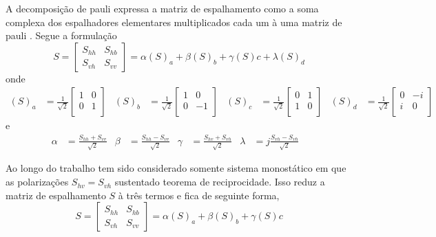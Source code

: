\documentclass[a4paper,12pt]{article}
\begin{document}
A decomposição de pauli expressa a matriz de espalhamento como a soma complexa dos espalhadores elementares multiplicados cada um à uma matriz de pauli \cite{jong:2009}. Segue a formulação
\begin{equation}
    S = \begin{bmatrix}
        S_{hh} & S_{hb}\\
	    S_{vh} & S_{vv}
    \end{bmatrix} = \alpha(S)_{a}+\beta(S)_{b}+\gamma(S){c} + \lambda(S)_{d}
\end{equation}
onde
\begin{align}
    (S)_{a} &= \frac{1}{\sqrt{2}} \begin{bmatrix} 1 & 0 \\ 0 & 1\\ \end{bmatrix} &
    (S)_{b} &= \frac{1}{\sqrt{2}} \begin{bmatrix} 1 & 0 \\ 0 & -1\\ \end{bmatrix}&
    (S)_{c} &= \frac{1}{\sqrt{2}} \begin{bmatrix} 0 & 1 \\ 1 & 0\\ \end{bmatrix} &
    (S)_{d} &= \frac{1}{\sqrt{2}} \begin{bmatrix} 0 & -i \\ i & 0\\ \end{bmatrix}& 
\end{align}
e
\begin{align}
    \alpha &= \frac{S_{hh} + S_{vv}}{\sqrt{2}}&
    \beta &= \frac{S_{hh} - S_{vv}}{\sqrt{2}}&
    \gamma &= \frac{S_{hv} + S_{vh}}{\sqrt{2}}&
    \lambda &= j \frac{S_{vh} - S_{vh}}{\sqrt{2}}&
\end{align}

Ao longo do trabalho tem sido considerado somente sistema monostático em que as polarizações $S_{hv}=S_{vh}$ sustentado teorema de reciprocidade. Isso reduz a matriz de espalhamento $S$ à três termos e fica de seguinte forma,
\begin{equation}
    S = \begin{bmatrix}
	S_{hh} & S_{hb}\\
	S_{vh} & S_{vv}
	\end{bmatrix} =\alpha(S)_{a}+\beta(S)_{b}+\gamma(S){c} 
\end{equation}
\end{document}
